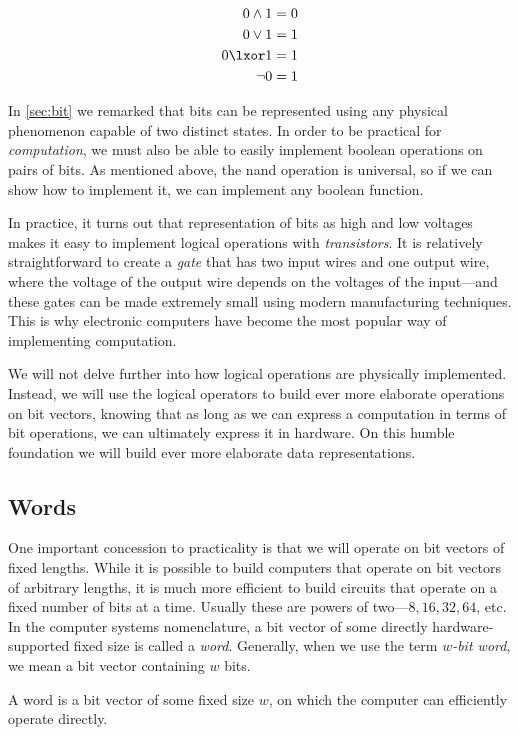 \begin{align}
  0 \land 1 &= 0 \\
  0 \lor 1 &= 1 \\
  0 \lxor 1 &= 1 \\
  \neg 0 &= 1
\end{align}

In \cref{sec:bit} we remarked that bits can be represented using any
physical phenomenon capable of two distinct states.  In order to be
practical for \emph{computation}, we must also be able to easily
implement boolean operations on pairs of bits.  As mentioned above,
the nand operation is universal, so if we can show how to implement
it, we can implement any boolean function.

In practice, it turns out that representation of bits as high and low
voltages makes it easy to implement logical operations with
\emph{transistors}.  It is relatively straightforward to create a
\emph{gate} that has two input wires and one output wire, where the
voltage of the output wire depends on the voltages of the input---and
these gates can be made extremely small using modern manufacturing
techniques.  This is why electronic computers have become the most
popular way of implementing computation.

We will not delve further into how logical operations are physically
implemented.  Instead, we will use the logical operators to build ever
more elaborate operations on bit vectors, knowing that as long as we
can express a computation in terms of bit operations, we can
ultimately express it in hardware.  On this humble foundation we will
build ever more elaborate data representations.

\subsection{Words}
\label{sec:words}

One important concession to practicality is that we will operate on
bit vectors of fixed lengths.  While it is possible to build computers
that operate on bit vectors of arbitrary lengths, it is much more
efficient to build circuits that operate on a fixed number of bits at
a time.  Usually these are powers of two---$8,16,32,64$, etc.  In the
computer systems nomenclature, a bit vector of some directly
hardware-supported fixed size is called a \emph{word}.  Generally,
when we use the term \emph{$w$-bit word}, we mean a bit vector
containing $w$ bits.

\begin{definition}[Word]
  A word is a bit vector of some fixed size $w$, on which the computer
  can efficiently operate directly.
\end{definition}

